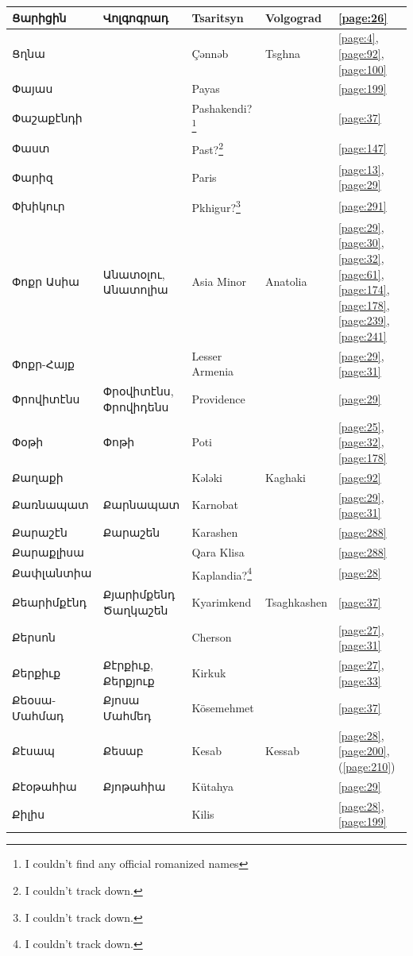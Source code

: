 \begin{center}
\begin{longtable}{|p{}|p{3cm}|p{3cm}|p{2cm}|p{3cm}|}
	Ցարիցին&Վոլգոգրադ & Tsaritsyn&Volgograd &\ref{page:26}\\ \hline
	Ցղնա& &Çənnəb   &Tsghna &\ref{page:4}, \ref{page:92}, \ref{page:100}\\ \hline
	Փայաս& & Payas& &\ref{page:199}\\ \hline
	Փաշաքէնդի& &Pashakendi?\footnote{I couldn't find any official romanized names} & &\ref{page:37}\\ \hline
	Փաստ& & Past?\footnote{I couldn't track down.}& &\ref{page:147}\\ \hline
	Փարիզ& & Paris& &\ref{page:13}, \ref{page:29}\\ \hline
	Փխիկուր& &Pkhigur?\footnote{I couldn't track down.} & &\ref{page:291}\\ \hline
	Փոքր Ասիա &Անատօլու, Անատոլիա &
	Asia Minor&Anatolia &\ref{page:29}, \ref{page:30}, \ref{page:32}, \ref{page:61}, \ref{page:174}, \ref{page:178}, \ref{page:239}, \ref{page:241}\\ \hline
	Փոքր-Հայք& &Lesser Armenia & &\ref{page:29}, \ref{page:31}\\ \hline
	Փրովիտէնս& Փրօվիտէնս, Փրովիդենս& Providence& &\ref{page:29}\\ \hline
	Փօթի& Փոթի& Poti& &\ref{page:25}, \ref{page:32}, \ref{page:178}\\ \hline
	Քաղաքի& &    Kələki&Kaghaki &\ref{page:92}\\ \hline
	Քառնապատ&Քարնապատ &Karnobat & &\ref{page:29}, \ref{page:31}\\ \hline
	Քարաշէն& Քարաշեն&Karashen   & &\ref{page:288}\\ \hline
	Քարաքլիսա& &Qara Klisa & &\ref{page:288}\\ \hline
	Քափլանտիա& &Kaplandia?\footnote{I couldn't track down.} & &\ref{page:28}\\ \hline
	Քեարիմքէնդ&Քյարիմքենդ  Ծաղկաշեն& Kyarimkend&Tsaghkashen &\ref{page:37}\\ \hline
	Քերսոն& &Cherson & &\ref{page:27}, \ref{page:31}\\ \hline
	Քերքիւք&Քէրքիւք, Քերքյուք &Kirkuk & &\ref{page:27}, \ref{page:33}\\ \hline
	Քեօսա-Մահմադ& Քյոսա Մահմեդ&Kösemehmet & &\ref{page:37}\\ \hline
	Քէսապ&Քեսաբ &Kesab &Kessab &\ref{page:28}, \ref{page:200}, (\ref{page:210})\\ \hline
	Քէօթահիա&   Քյոթահիա &Kütahya & &\ref{page:29}\\ \hline
	Քիլիս& &Kilis & &\ref{page:28}, \ref{page:199}\\ \hline

\end{longtable}
\end{center}
